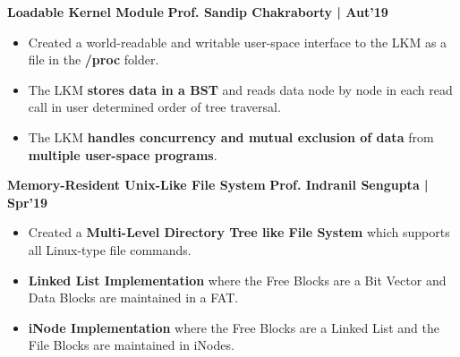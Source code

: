 \documentclass[10pt]{article}
\begin{document}
\large {\textbf{Loadable Kernel Module}} \normalsize \href{https://github.com/shmundhra/Systems-Programming/blob/master/LKM/LKM_BST.pdf} {\hspace{0.5ex}\faGithub} {\hfill} \textbf{Prof. Sandip Chakraborty | Aut'19}\\[-1.75em]
\begin{itemize}
    \item Created a world-readable and writable user-space interface to the LKM as a file in the \textbf{/proc} folder. \\[-1.9em]
    \item The LKM \textbf{stores data in a BST} and reads data node by node in each read call in user determined order of tree traversal. \\[-1.9em]
    \item The LKM \textbf{handles concurrency and mutual exclusion of data} from \textbf{multiple user-space programs}.\\[-1em]
\end{itemize}
\large {\textbf{Memory-Resident Unix-Like File System}} \normalsize  \href{https://github.com/shmundhra/Systems-Programming/tree/master/File_System} {\hspace{0.5ex}\faGithub} {\hfill} \textbf{Prof. Indranil Sengupta | Spr'19}\\[-1.75em]
\begin{itemize}
    \item Created a \textbf{Multi-Level Directory Tree like File System} which supports all Linux-type file commands.\\[-1.9em]
    \item \textbf{Linked List Implementation} where the {Free Blocks are a Bit Vector} and {Data Blocks are maintained in a FAT}.\\[-1.9em]
    \item \textbf{iNode Implementation} where the {Free Blocks are a Linked List}  and the {File Blocks are maintained in iNodes}.\\[-1em]
\end{itemize}
\end{document}
